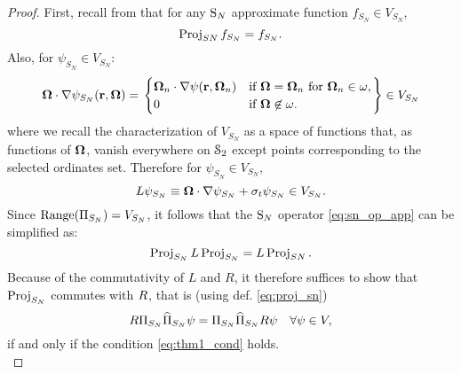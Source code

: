 \begin{proof}
First, recall from  that for any $\SN$ approximate function \mbox{$f_{S_N}\in V_{S_N}$}, 
$$
	\Projop[SN]f_{S_N} = f_{S_N}.
$$
Also, for $\psi_{S_N} \in V_{S_N}$:
$$
	\bomega\cdot\nabla\psi_{S_N}(\br,\bomega) = \left.\pw{
		\bomega_n\cdot\nabla\psi(\br,\bomega_n)}{if $\bomega = \bomega_n$ for $\bomega_n\in\omega$}
		{0}{if $\bomega \not \in \omega$.}\right\} \in V_{S_N}
$$
where we recall the characterization of $V_{S_N}$ as a space of functions that, as functions of $\bomega$, vanish
everywhere on $\Sphere$ except points corresponding to the selected ordinates set. Therefore for $\psi_{S_N} \in
V_{S_N}$, 
$$
	L\psi_{S_N} \equiv \bomega\cdot\nabla\psi_{S_N} + \sigma_t\psi_{S_N} \in V_{S_N}.
$$
Since \mbox{$\Rng (\PiSN) = V_{S_N}$}, it follows that the $\SN$ operator \eqref{eq:sn_op_app} can be simplified as:
\begin{equation}\label{eq:sn_op2}
	\Projop[S_N]\op{L}\Projop[S_N] = \op{L} \Projop[SN].
\end{equation}
Because of the commutativity of $L$ and $R$, it therefore suffices to show that $\Projop[S_N]$ commutes
with $\op{R}$, that is (using def. \eqref{eq:proj_sn})
\begin{equation}\label{eq:thm1_point}
	R \PiSN \PihSN \psi = \PiSN \PihSN R \psi\quad  \forall \psi \in V, 
\end{equation}
if and only if the condition \eqref{eq:thm1_cond} holds.\\[.2em] 


\end{proof}
